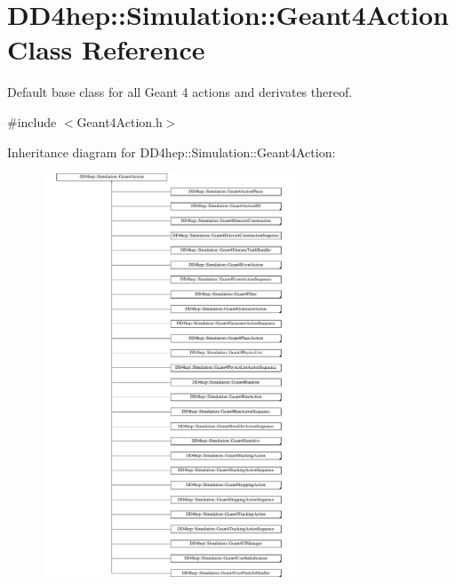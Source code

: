 \hypertarget{class_d_d4hep_1_1_simulation_1_1_geant4_action}{}\section{D\+D4hep\+:\+:Simulation\+:\+:Geant4\+Action Class Reference}
\label{class_d_d4hep_1_1_simulation_1_1_geant4_action}


Default base class for all Geant 4 actions and derivates thereof.  




{\ttfamily \#include $<$Geant4\+Action.\+h$>$}

Inheritance diagram for D\+D4hep\+:\+:Simulation\+:\+:Geant4\+Action\+:\begin{figure}[H]
\begin{center}
\leavevmode
\includegraphics[height=12.000000cm]{class_d_d4hep_1_1_simulation_1_1_geant4_action}
\end{center}
\end{figure}
